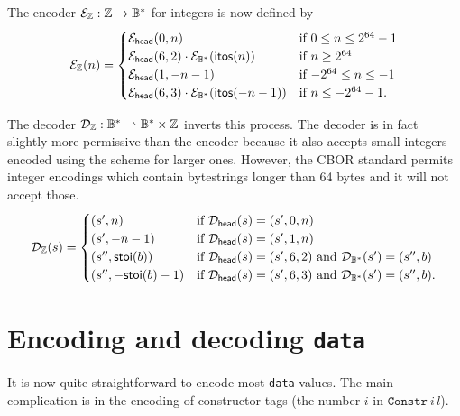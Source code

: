 \noindent 
The encoder $\mathcal{E}_{\mathbb{Z}}: \mathbb{Z} \rightarrow \mathbb{B}^*$ for integers is now defined by
$$ \mathcal{E}_{\mathbb{Z}}(n) =
\begin{cases}
  \mathcal{E}_{\mathsf{head}}(0,n)                             & \text{if $0\leq n \leq 2^{64}-1$}\\
  \mathcal{E}_{\mathsf{head}}(6,2) \cdot \mathcal{E}_{\mathbb{B}^*}(\mathsf{itos}(n))    & \text{if $n \geq 2^{64}$}\\
  \mathcal{E}_{\mathsf{head}}(1,-n-1)                          & \text{if $-2^{64} \leq n \leq -1$}\\
  \mathcal{E}_{\mathsf{head}}(6,3) \cdot \mathcal{E}_{\mathbb{B}^*}(\mathsf{itos}(-n-1)) & \text{if $n \leq -2^{64}-1$}.
\end{cases}
$$

\noindent The decoder $\mathcal{D}_{\mathbb{Z}}: \mathbb{B}^* \rightharpoonup \mathbb{B}^* \times \mathbb{Z}$ inverts this
process. The decoder is in fact slightly more permissive than the encoder
because it also accepts small integers encoded using the scheme for larger ones.
However, the CBOR standard permits integer encodings which contain bytestrings
longer than 64 bytes and it will not accept those.
$$ \mathcal{D}_{\mathbb{Z}}(s) =
\begin{cases}
  (s', n)               & \text{if $\mathcal{D}_{\mathsf{head}}(s) = (s', 0,n)$}\\
  (s', -n-1)            & \text{if $\mathcal{D}_{\mathsf{head}}(s) = (s', 1,n)$}\\
  (s'', \mathsf{stoi}(b))       & \text{if $\mathcal{D}_{\mathsf{head}}(s) = (s', 6,2)$ and $\mathcal{D}_{\mathbb{B}^*}(s') = (s'', b)$}\\
  (s'', -\mathsf{stoi}(b)-1)    & \text{if $\mathcal{D}_{\mathsf{head}}(s) = (s', 6,3)$ and $\mathcal{D}_{\mathbb{B}^*}(s') = (s'', b)$}.\\
\end{cases}
$$



\section{Encoding and decoding \texttt{data}}
\label{sec:encoding-data}
\newcommand\eData{\e_{\mathtt{data}}}
\newcommand\eDataStar{\e_{\mathtt{data^*}}}
\newcommand\eDataStarSq{\e_{\mathtt{(data^2)^*}}}

\newcommand\dData{\d_{\mathtt{data}}}
\newcommand\dDataStar{\d_{\mathtt{data^*}}}
\newcommand\dDataStarSq{\d_{\mathtt{(data^2)^*}}}

It is now quite straightforward to encode most \texttt{data} values.  The main
complication is in the encoding of constructor tags (the number $i$ in
$\mathtt{Constr}\: i\, l$).

